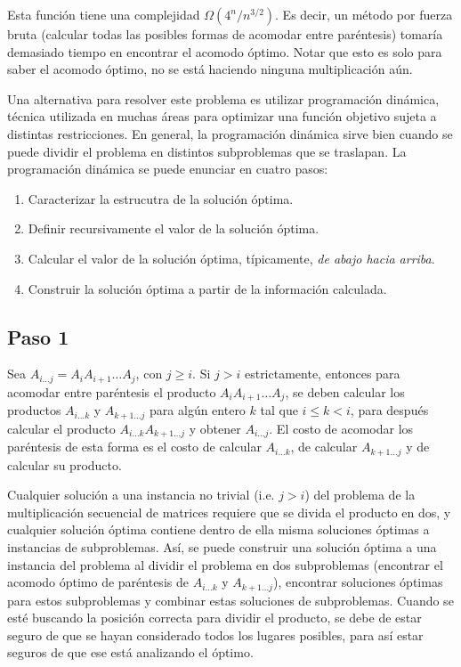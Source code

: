 \documentclass{article}
\begin{document}
Esta función tiene una complejidad $\Omega(4^n / n^{3/2}) $. Es decir, un método por fuerza bruta (calcular todas las posibles formas de acomodar entre paréntesis) tomaría demasiado tiempo en encontrar el acomodo óptimo. Notar que esto es solo para saber el acomodo óptimo, no se está haciendo ninguna multiplicación aún.

Una alternativa para resolver este problema es utilizar programación dinámica, técnica utilizada en muchas áreas para optimizar una función objetivo sujeta a distintas restricciones. En general, la programación dinámica sirve bien cuando se puede dividir el problema en distintos subproblemas que se traslapan. La programación dinámica se puede enunciar en cuatro pasos:

\begin{enumerate}
	\item Caracterizar la estrucutra de la solución óptima.
	\item Definir recursivamente el valor de la solución óptima.
	\item Calcular el valor de la solución óptima, típicamente, \textit{de abajo hacia arriba}.
	\item Construir la solución óptima a partir de la información calculada.
\end{enumerate}

\subsection*{Paso 1}

Sea $A_{i \hdots j} = A_i A_{i + 1} \hdots A_{j}$, con $j \geq i$. Si $j > i$ estrictamente, entonces para acomodar entre paréntesis el producto $A_i A_{i + 1} \hdots A_{j}$, se deben calcular los productos $A_{i \hdots k}$ y $A_{k + 1 \hdots j}$ para algún entero $k$ tal que $i \leq k < i$, para después calcular el producto $A_{i \hdots k} A_{k + 1 \hdots j}$ y obtener $A_{i \hdots j}$. El costo de acomodar los paréntesis de esta forma es el costo de calcular $A_{i \hdots k}$, de calcular $A_{k + 1 \hdots j}$ y de calcular su producto.

Cualquier solución a una instancia no trivial (i.e. $j > i$) del problema de la multiplicación secuencial de matrices requiere que se divida el producto en dos, y cualquier solución óptima contiene dentro de ella misma soluciones óptimas a instancias de subproblemas. Así, se puede construir una solución óptima a una instancia del problema al dividir el problema en dos subproblemas (encontrar el acomodo óptimo de paréntesis de $A_{i \hdots k}$ y $A_{k + 1 \hdots j}$), encontrar soluciones óptimas para estos subproblemas y combinar estas soluciones de subproblemas. Cuando se esté buscando la posición correcta para dividir el producto, se debe de estar seguro de que se hayan considerado todos los lugares posibles, para así estar seguros de que ese está analizando el óptimo.
\end{document}
